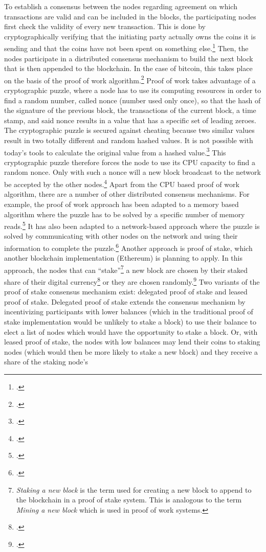 To establish a consensus between the nodes regarding agreement on which transactions are valid and can be included in the blocks, the participating nodes first check the validity of every new transaction. This is done by cryptographically verifying that the initiating party actually owns the coins it is sending and that the coins have not been spent on something else.\footcite[Cf.][p.68]{AntonopolousAndreasM..2017} Then, the nodes participate in a distributed consensus mechanism to build the next block that is then appended to the blockchain. In the case of bitcoin, this takes place on the basis of the proof of work algorithm.\footcites[Cf.][]{Dwork.1993}[cf.][p.3]{Nakamoto.2008} Proof of work takes advantage of a cryptographic puzzle, where a node has to use its computing resources in order to find a random number, called nonce (number used only once), so that the hash of the signature of the previous block, the transactions of the current block, a time stamp, and said nonce results in a value that has a specific set of leading zeroes. The cryptographic puzzle is secured against cheating because two similar values result in two totally different and random hashed values. It is not possible with today's tools to calculate the original value from a hashed value.\footcite[Cf.][p.12]{SwanBlockchainblueprintnew2015} This cryptographic puzzle therefore forces the node to use its CPU capacity to find a random nonce. Only with such a nonce will a new block broadcast to the network be accepted by the other nodes.\footcites[Cf.][p.8]{Nakamoto.2008}[cf.][p.12]{Schutte.2017} Apart from the CPU based proof of work algorithm, there are a number of other distributed consensus mechanisms. For example, the proof of work approach has been adapted to a memory based algorithm where the puzzle has to be solved by a specific number of memory reads.\footcite[Cf.][]{Abadi.2005} It has also been adapted to a network-based approach where the puzzle is solved by communicating with other nodes on the network and using their information to complete the puzzle.\footcite[Cf.][]{Abliz.2009} Another approach is proof of stake, which another blockchain implementation (Ethereum) is planning to apply. In this approach, the nodes that can \enquote{stake}\footnote{\textit{Staking a  new block} is the term used for creating a new block to append to the blockchain in a proof of stake system. This is analogous to the term \textit{Mining a new block} which is used in proof of work systems.} a new block are chosen by their staked share of their digital currency\footcite[Cf.][]{King.2012} or they are chosen randomly.\footcites[Cf.][]{w.A..2016}[cf.][p.200]{AntonopolousAndreasM..2017}[cf.][p.11 et seq]{Schlatt.2016} Two variants of the proof of stake consensus mechanism exist: delegated proof of stake and leased proof of stake. Delegated proof of stake extends the consensus mechanism by incentivizing participants with lower balances (which in the traditional proof of stake implementation would be unlikely to stake a block) to use their balance to elect a list of nodes which would have the opportunity to stake a block. Or, with leased proof of stake, the nodes with low balances may lend their coins to staking nodes (which would then be more likely to stake a new block) and they receive a share of the staking node's 